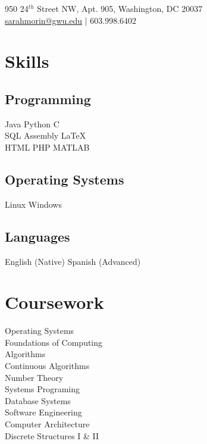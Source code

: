 \documentclass[]{deedy-resume-openfont}
\begin{document}
%
%
\lastupdated

%
%
{   950 24$^{th}$ Street NW, Apt. 905, Washington, DC 20037 \\
 \href{mailto:sarahmorin@gwu.edu}{sarahmorin@gwu.edu} | 603.998.6402 }


\begin{minipage}[t]{0.33\textwidth} 

        \section{Skills}
        \subsection{Programming}
        Java \textbullet{}  Python \textbullet{} C \\
        SQL \textbullet{} Assembly \textbullet{} \LaTeX\ \\ 
        HTML \textbullet{} PHP \textbullet{} MATLAB \\
        \sectionsep
        \subsection{Operating Systems}
        Linux \textbullet{} Windows \\
        \sectionsep
        \subsection{Languages}
        English (Native) \textbullet{} Spanish (Advanced)\\
        \sectionsep


        \section{Coursework}
        Operating Systems\\
        Foundations of Computing\\
        Algorithms\\
        Continuous Algorithms\\
        Number Theory\\
        Systems Programing\\
        Database Systems\\
        Software Engineering\\
        Computer Architecture\\
        Discrete Structures I \& II \\


\end{minipage}
\end{document}
